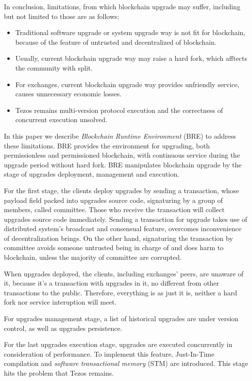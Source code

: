 \documentclass[sigplan,screen]{acmart}
\begin{document}
In conclusion, limitations, from which blockchain upgrade may suffer,
including but not limited to those are as follows:
\begin{itemize}
  \item Traditional software upgrade or system upgrade way is not fit for
    blockchain, because of the feature of untrusted and decentralized of
    blockchain.
  \item Usually, current blockchain upgrade way may raise a hard fork, which
    afftects the community with split.
  \item For exchanges, current blockchain upgrade way provides unfriendly
    service, causes unnecessary economic losses.
  \item Tezos remains multi-version protocol execution and the correctness of
    concurrent execution unsolved.
\end{itemize}

In this paper we describe
\textit{Blockchain Runtime Environment} (BRE) to address these limitations.
BRE provides the environment for upgrading, both permissionless and
permissioned blockchain, with continuous service during the upgrade period
without hard fork. BRE manipulates blockchain upgrade by the stage of upgrades
deployment, management and execution.

For the first stage,
the clients deploy upgrades by sending a transaction, whose payload
field packed into upgrades source code, signaturing by a group
of members, called committee. Those who receive the transaction will collect
upgrades source code immediately. Sending a transaction for
upgrade takes use of distributed system's broadcast and consensual feature,
overcomes inconvenience of decentralization brings.
On the other hand, signaturing the transaction by committee avoids someone
untrusted being in charge of and does harm to blockchain, unless the majority
of committee are corrupted.

When upgrades deployed, the clients, including exchanges' peers, are unaware
of it, because it's a transaction with upgrades in it, no different
from other transactions to the public.
Therefore, everything is as just it is, neither a hard fork nor service
interuption will meet.

For upgrades management stage, a list of historical upgrades are under version
control, as well as upgrades persistence.

For the last upgrades execution stage, upgrades are executed concurrently in
consideration of performance. To implement this feature, Just-In-Time
compilation and \textit{software transactional memory} (STM) are introduced.
This stage hits the problem that Tezos remains.
\end{document}
